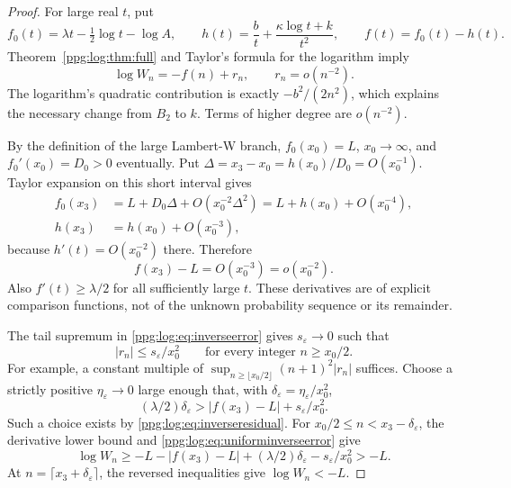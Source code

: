 \documentclass[11pt,letterpaper]{article}
\theoremstyle{remark}\newtheorem{remark}[theorem]{Remark}
\numberwithin{equation}{section}
\begin{document}
\begin{proof}
For large real $t$, put
\[
 f_0(t)=\lambda t-\tfrac12\log t-\log A,\qquad
 h(t)=\frac b t+\frac{\kappa\log t+k}{t^2},\qquad f(t)=f_0(t)-h(t).
\]
Theorem~\ref{ppg:log:thm:full} and Taylor's formula for the logarithm imply
\begin{equation}\label{ppg:log:eq:inverseerror}
 \log W_n=-f(n)+r_n,\qquad r_n=o(n^{-2}).
\end{equation}
The logarithm's quadratic contribution is exactly $-b^2/(2n^2)$, which explains the necessary change from $B_2$ to $k$. Terms of higher degree are $o(n^{-2})$.

By the definition of the large Lambert-W branch, $f_0(x_0)=L$, $x_0\to\infty$, and $f_0'(x_0)=D_0>0$ eventually. Put $\Delta=x_3-x_0=h(x_0)/D_0=O(x_0^{-1})$. Taylor expansion on this short interval gives
\begin{align*}
 f_0(x_3)&=L+D_0\Delta+O(x_0^{-2}\Delta^2)
          =L+h(x_0)+O(x_0^{-4}),\\
 h(x_3)&=h(x_0)+O(x_0^{-3}),
\end{align*}
because $h'(t)=O(x_0^{-2})$ there. Therefore
\begin{equation}\label{ppg:log:eq:inverseresidual}
 f(x_3)-L=O(x_0^{-3})=o(x_0^{-2}).
\end{equation}
Also $f'(t)\ge\lambda/2$ for all sufficiently large $t$. These derivatives are of explicit comparison functions, not of the unknown probability sequence or its remainder.

The tail supremum in \eqref{ppg:log:eq:inverseerror} gives $s_\varepsilon\to0$ such that
\begin{equation}\label{ppg:log:eq:uniforminverseerror}
 |r_n|\le s_\varepsilon/x_0^2\qquad\text{for every integer }n\ge x_0/2.
\end{equation}
For example, a constant multiple of $\sup_{n\ge\lfloor x_0/2\rfloor}(n+1)^2|r_n|$ suffices. Choose a strictly positive $\eta_\varepsilon\to0$ large enough that, with $\delta_\varepsilon=\eta_\varepsilon/x_0^2$,
\begin{equation}\label{ppg:log:eq:inversemargin}
 (\lambda/2)\delta_\varepsilon>|f(x_3)-L|+s_\varepsilon/x_0^2.
\end{equation}
Such a choice exists by \eqref{ppg:log:eq:inverseresidual}. For $x_0/2\le n<x_3-\delta_\varepsilon$, the derivative lower bound and \eqref{ppg:log:eq:uniforminverseerror} give
\[
 \log W_n\ge-L-|f(x_3)-L|+(\lambda/2)\delta_\varepsilon
                  -s_\varepsilon/x_0^2>-L.
\]
At $n=\lceil x_3+\delta_\varepsilon\rceil$, the reversed inequalities give $\log W_n<-L$.


\end{proof}
\end{document}
